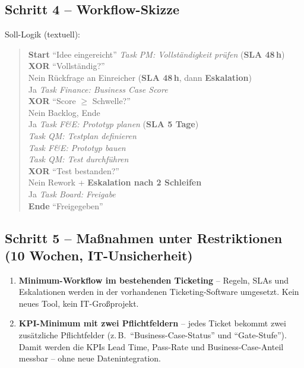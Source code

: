 \documentclass[11pt,a4paper,oneside]{article}
\newcommand{\fachbegriff}[1]{\textbf{#1}}
\begin{document}
\subsection{Schritt 4 -- Workflow-Skizze}

Soll-Logik (textuell):

\begin{quote}
\textbf{Start} ``Idee eingereicht'' \textrightarrow{} \emph{Task PM: Vollständigkeit prüfen} (\textbf{SLA 48\,h}) \\
\textrightarrow{} \textbf{XOR} ``Vollständig?'' \\
\qquad Nein \textrightarrow{} Rückfrage an Einreicher (\textbf{SLA 48\,h}, dann \textbf{Eskalation}) \\
\qquad Ja \textrightarrow{} \emph{Task Finance: Business Case Score} \\
\textrightarrow{} \textbf{XOR} ``Score $\geq$ Schwelle?'' \\
\qquad Nein \textrightarrow{} Backlog, Ende \\
\qquad Ja \textrightarrow{} \emph{Task F\&E: Prototyp planen} (\textbf{SLA 5 Tage}) \\
\textrightarrow{} \emph{Task QM: Testplan definieren} \\
\textrightarrow{} \emph{Task F\&E: Prototyp bauen} \\
\textrightarrow{} \emph{Task QM: Test durchführen} \\
\textrightarrow{} \textbf{XOR} ``Test bestanden?'' \\
\qquad Nein \textrightarrow{} Rework + \textbf{Eskalation nach 2 Schleifen} \\
\qquad Ja \textrightarrow{} \emph{Task Board: Freigabe} \\
\textrightarrow{} \textbf{Ende} ``Freigegeben''
\end{quote}

\subsection{Schritt 5 -- Maßnahmen unter Restriktionen (10 Wochen, IT-Unsicherheit)}

\begin{enumerate}
  \item \fachbegriff{Minimum-Workflow im bestehenden Ticketing} -- Regeln, SLAs und Eskalationen werden in der vorhandenen Ticketing-Software umgesetzt. Kein neues Tool, kein IT-Großprojekt.
  \item \fachbegriff{KPI-Minimum mit zwei Pflichtfeldern} -- jedes Ticket bekommt zwei zusätzliche Pflichtfelder (z.\,B.\ ``Business-Case-Status'' und ``Gate-Stufe''). Damit werden die KPIs Lead Time, Pass-Rate und Business-Case-Anteil messbar -- ohne neue Daten­integration.
\end{enumerate}
\end{document}

